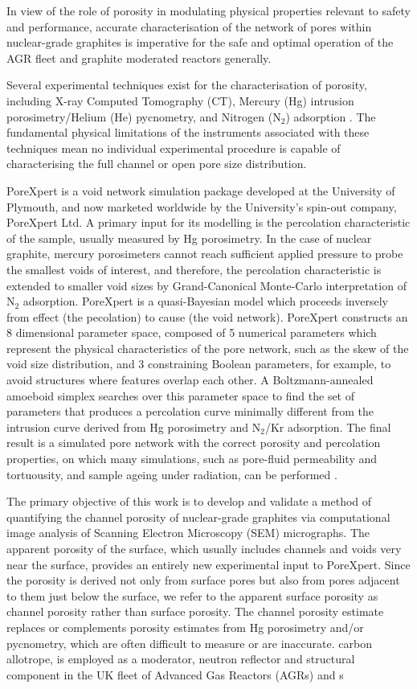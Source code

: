 \documentclass[12pt,a4paper]{report}
\begin{document}
In view of the role of porosity in modulating physical properties relevant to safety and performance, accurate characterisation of the network of pores within nuclear-grade graphites is imperative for the safe and optimal operation of the AGR fleet and graphite moderated reactors generally.

Several experimental techniques exist for the characterisation of porosity, including X-ray Computed Tomography (CT), Mercury (Hg) intrusion porosimetry/Helium (He) pycnometry, and Nitrogen (N$_2$) adsorption \citep{ARREGUIMENA2022112047, JONES2020256HgHe, CONTESCU2019663}. The fundamental physical limitations of the instruments associated with these techniques mean no individual experimental procedure is capable of characterising the full channel or open pore size distribution.

PoreXpert is a void network simulation package developed at the University of Plymouth, and now marketed worldwide by the University's spin-out company, PoreXpert Ltd. A primary input for its modelling is the percolation characteristic of the sample, usually measured by Hg porosimetry.  In the case of nuclear graphite, mercury porosimeters cannot reach sufficient applied pressure to probe the smallest voids of interest, and therefore, the percolation characteristic is extended to smaller void sizes by Grand-Canonical Monte-Carlo interpretation of N$_2$ adsorption.  PoreXpert is a quasi-Bayesian model which proceeds inversely from effect (the pecolation) to cause (the void network).  PoreXpert constructs an 8 dimensional parameter space,  composed of 5 numerical parameters which represent the physical characteristics of the pore network, such as the skew of the void size distribution, and 3 constraining Boolean parameters, for example, to avoid structures where features overlap each other. A Boltzmann-annealed amoeboid simplex searches over this parameter space to find the set of parameters that produces a percolation curve minimally different from the intrusion curve derived from Hg porosimetry and N$_2$/Kr adsorption. The final result is a simulated pore network with the correct porosity and percolation properties, on which many simulations, such as pore-fluid permeability and tortuousity, and sample ageing under radiation, can be performed \citep{MatthewsPoreXpert2025}.

The primary objective of this work is to develop and validate a method of quantifying the channel porosity of nuclear-grade graphites via computational image analysis of Scanning Electron Microscopy (SEM) micrographs. The apparent porosity of the surface, which usually includes channels and voids very near the surface, provides an entirely new experimental input to PoreXpert.  Since the porosity is derived not only from surface pores but also from pores adjacent to them just below the surface, we refer to the apparent surface porosity as channel porosity rather than surface porosity. The channel porosity estimate replaces or complements porosity estimates from Hg porosimetry and/or pycnometry, which are often difficult to measure or are inaccurate.  carbon allotrope, is employed as a moderator, neutron reflector and structural component in the UK fleet of Advanced Gas Reactors (AGRs) and s



\end{document}
